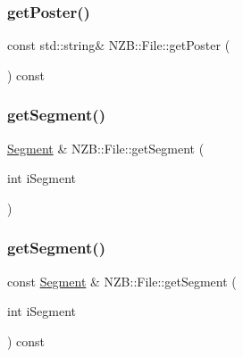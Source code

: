 \hypertarget{class_n_z_b_1_1_file_af093b1edbffcafdae7f37c05d6581d0e}{}\label{class_n_z_b_1_1_file_af093b1edbffcafdae7f37c05d6581d0e} 
\subsubsection{\texorpdfstring{get\+Poster()}{getPoster()}\hspace{0.1cm}{\footnotesize\ttfamily [2/2]}}
{\footnotesize\ttfamily const std\+::string\& N\+Z\+B\+::\+File\+::get\+Poster (\begin{DoxyParamCaption}{ }\end{DoxyParamCaption}) const\hspace{0.3cm}{\ttfamily [inline]}}

\hypertarget{class_n_z_b_1_1_file_a5f4d723636e54b354f89c34cd3e578cb}{}\label{class_n_z_b_1_1_file_a5f4d723636e54b354f89c34cd3e578cb} 
\subsubsection{\texorpdfstring{get\+Segment()}{getSegment()}\hspace{0.1cm}{\footnotesize\ttfamily [1/2]}}
{\footnotesize\ttfamily \hyperlink{class_n_z_b_1_1_segment}{Segment} \& N\+Z\+B\+::\+File\+::get\+Segment (\begin{DoxyParamCaption}\item[{int}]{i\+Segment }\end{DoxyParamCaption})}

\hypertarget{class_n_z_b_1_1_file_a092df4f0a0e79ebf21c033f45d83b67f}{}\label{class_n_z_b_1_1_file_a092df4f0a0e79ebf21c033f45d83b67f} 
\subsubsection{\texorpdfstring{get\+Segment()}{getSegment()}\hspace{0.1cm}{\footnotesize\ttfamily [2/2]}}
{\footnotesize\ttfamily const \hyperlink{class_n_z_b_1_1_segment}{Segment} \& N\+Z\+B\+::\+File\+::get\+Segment (\begin{DoxyParamCaption}\item[{int}]{i\+Segment }\end{DoxyParamCaption}) const}

